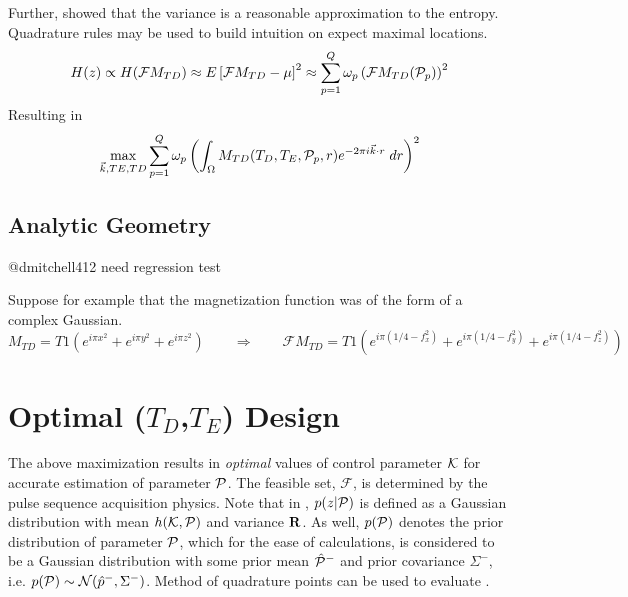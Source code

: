 \documentclass{article}         %
\theoremstyle{definition}
\theoremstyle{remark}
\begin{document}
Further, \cite{madankan2015accelerated} showed that the variance is a reasonable
approximation to the entropy. Quadrature rules may be used to build
intuition on expect maximal locations.
\[
 H(z)   \propto H(\mathcal{F}M_{TD} )
   \approx E\left[\mathcal{F}M_{TD} - \mu\right]^2
   \approx \sum_{p=1}^Q \omega_p \left( \mathcal{F}M_{TD}(\mathcal{P}_p) \right)^2
\]
Resulting in 
\[
   \max_{\vec{k},TE,TD} \sum_{p=1}^Q \omega_p \left(
     \int_\Omega M_{TD}(T_D,T_E,\mathcal{P}_p,r)
          e^{-2  \pi i \vec{k}  \cdot r } \; dr
     \right)^2
\]

\subsection{Analytic Geometry}
{\color{red} @dmitchell412 need regression test}

Suppose for example that the magnetization function was of the form of a complex Gaussian.
\[
   M_{TD} = T1 \left( e^{i \pi x^2}
                    + e^{i \pi y^2}
                    + e^{i \pi z^2}
               \right)
  \qquad
  \Rightarrow
  \qquad
  \mathcal{F} M_{TD} =
            T1 \left(  e^{i \pi (1/4 - f_x^2)}
                     + e^{i \pi (1/4 - f_y^2)}
                     + e^{i \pi (1/4 - f_z^2)}
               \right)
\]

\section{Optimal ($T_D$,$T_E$) Design}\label{oed}

The above maximization results in \textit{optimal} values of control parameter
$\mathcal{K}$ for accurate estimation of parameter $\mathcal{P}$. 
The feasible set, $\mathcal{F}$, is determined by the pulse sequence acquisition physics.
Note that in ,
$p(z|\mathcal{P})$ is defined as a Gaussian distribution with mean $h(\mathcal{K},\mathcal{P})$ and
variance $\mathbf{R}$. As well, $p(\mathcal{P})$ denotes the prior distribution of parameter
$\mathcal{P}$, which for the ease of calculations, is considered to be a Gaussian
distribution with some prior mean $\hat{\mathcal{P}}^-$ and prior covariance $\Sigma^-$,
i.e. $p(\mathcal{P})\sim \mathcal{N}(\hat{p}^-,\Sigma^-)$. Method of quadrature points
can be used to evaluate . 
\end{document}
